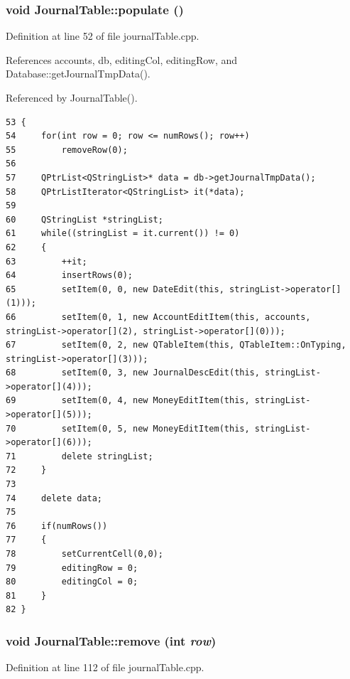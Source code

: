 \hypertarget{classJournalTable_a5}{
\subsubsection[populate]{\setlength{\rightskip}{0pt plus 5cm}void Journal\-Table::populate ()}}
\label{classJournalTable_a5}


Definition at line 52 of file journal\-Table.cpp.

References accounts, db, editing\-Col, editing\-Row, and Database::get\-Journal\-Tmp\-Data().

Referenced by Journal\-Table().

\footnotesize\begin{verbatim}53 {
54     for(int row = 0; row <= numRows(); row++)
55         removeRow(0);
56     
57     QPtrList<QStringList>* data = db->getJournalTmpData();
58     QPtrListIterator<QStringList> it(*data);
59     
60     QStringList *stringList;
61     while((stringList = it.current()) != 0)
62     {
63         ++it;
64         insertRows(0);
65         setItem(0, 0, new DateEdit(this, stringList->operator[](1)));
66         setItem(0, 1, new AccountEditItem(this, accounts, stringList->operator[](2), stringList->operator[](0)));
67         setItem(0, 2, new QTableItem(this, QTableItem::OnTyping, stringList->operator[](3)));
68         setItem(0, 3, new JournalDescEdit(this, stringList->operator[](4)));
69         setItem(0, 4, new MoneyEditItem(this, stringList->operator[](5)));
70         setItem(0, 5, new MoneyEditItem(this, stringList->operator[](6)));
71         delete stringList;
72     }
73 
74     delete data;
75 
76     if(numRows())
77     {
78         setCurrentCell(0,0);
79         editingRow = 0;
80         editingCol = 0;
81     }
82 }
\end{verbatim}\normalsize 


\hypertarget{classJournalTable_d1}{
\subsubsection[remove]{\setlength{\rightskip}{0pt plus 5cm}void Journal\-Table::remove (int {\em row})}}
\label{classJournalTable_d1}


Definition at line 112 of file journal\-Table.cpp.

